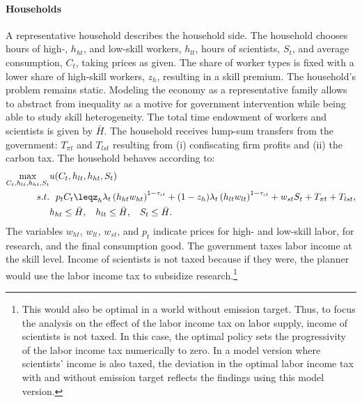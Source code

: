 \paragraph{Households}
A representative household describes the household side.
The household chooses hours of high-, $h_{ht}$, and low-skill workers, $h_{lt}$, hours of scientists, $S_t$, and average consumption, $C_t$, taking prices as given. The share of worker types is fixed with a lower share of high-skill workers, $z_h$, resulting in a skill premium. The household's problem remains static. Modeling the economy as a representative family allows to abstract from inequality as a motive for government intervention while being able to study skill heterogeneity. The total time endowment of workers and scientists is given by $\bar{H}$. %
The household receives lump-sum transfers from the government: $T_{\pi t}$ and $T_{lst}$ resulting from (i) confiscating firm profits and (ii) the carbon tax. The household behaves according to:
\begin{align*}
\underset{C_{t}, h_{lt}, h_{ht}, S_t}{\max}&
u(C_{t}, h_{lt}, h_{ht}, S_t)\\
s.t.& \ \ p_{t}C_{t}\leq%
z_h\lambda_t \left(h_{ht}w_{ht}\right)^{1-\tau_{\iota t}}+(1-z_h)\lambda_t\left(h_{lt}w_{lt}\right)^{1-\tau_{\iota t}}+w_{st}S_t+T_{\pi t}+T_{lst},\\
\ & h_{ht}\leq \bar{H},\ \hspace{2mm} h_{lt}\leq \bar{H},\ \hspace{2mm}  S_{t}\leq \bar{H}.
\end{align*}
The variables $w_{ht}$, $w_{lt}$, $w_{st}$, and $p_{t}$ indicate prices for high- and low-skill labor, for research, and the final consumption good.
The government taxes labor income at the skill level. Income of scientists is not taxed because if they were, the planner would use the labor income tax to subsidize research.\footnote{ This would also be optimal in a world without emission target. Thus, to focus the analysis on the effect of the labor income tax on labor supply, income of scientists is not taxed. In this case, the optimal policy sets the progressivity of the labor income tax numerically to zero. In a model version where scientists' income is also taxed, the deviation in the optimal labor income tax with and without emission target reflects the findings using this model version.}  %
